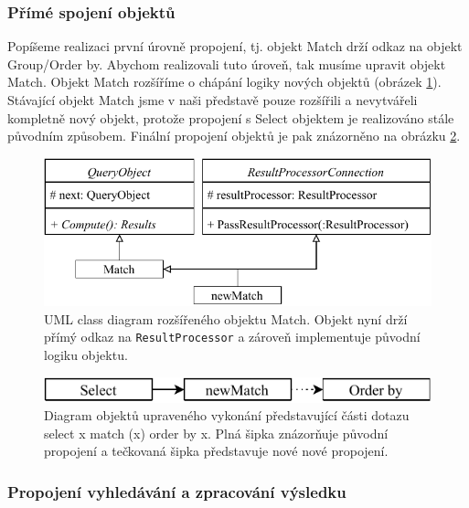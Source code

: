 \subsubsection{Přímé spojení objektů} \label{anal.improvement.con1}

Popíšeme realizaci první úrovně propojení, tj. objekt Match drží odkaz na objekt Group/Order by.
Abychom realizovali tuto úroveň, tak musíme upravit objekt Match.
Objekt Match rozšíříme o chápání logiky nových objektů (obrázek \ref{figure.diaStreamedQueryObjects}).
Stávající objekt Match jsme v naši představě pouze rozšířili a nevytvářeli kompletně nový objekt, protože propojení s Select objektem je realizováno stále původním způsobem.
Finální propojení objektů je pak znázorněno na obrázku \ref{figure.diaStreamedQueryObjectsCon}.

\begin{figure}[!htp]
\includegraphics{../img/diaStreamedQueryObjects.pdf}\centering
\caption{UML class diagram rozšířeného objektu Match. Objekt nyní drží přímý odkaz na \texttt{ResultProcessor} a zároveň implementuje původní logiku objektu.}
\label{figure.diaStreamedQueryObjects}
\end{figure}

\begin{figure}[!htp]
\includegraphics{../img/diaStreamedQueryObjectsCon.pdf}\centering
\caption{Diagram objektů upraveného vykonání představující části dotazu select x match (x) order by x. Plná šipka znázorňuje původní propojení a tečkovaná šipka představuje nové nové propojení.}
\label{figure.diaStreamedQueryObjectsCon}
\end{figure}

\subsubsection{Propojení vyhledávání a zpracování výsledku} \label{anal.improvement.con2}

